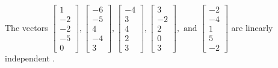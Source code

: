 \begin{exercise}
\begin{exerciseStatement}
  \end{exerciseStatement}
  \begin{exerciseAnswer}
   The vectors \(\left[\begin{array}{r}
1 \\
-2 \\
-2 \\
-5 \\
0
\end{array}\right] , \left[\begin{array}{r}
-6 \\
-5 \\
4 \\
-4 \\
3
\end{array}\right] , \left[\begin{array}{r}
-4 \\
3 \\
4 \\
2 \\
3
\end{array}\right] , \left[\begin{array}{r}
3 \\
-2 \\
2 \\
0 \\
3
\end{array}\right] , \text{ and } \left[\begin{array}{r}
-2 \\
-4 \\
1 \\
5 \\
-2
\end{array}\right]\) are 
  	 linearly independent  .
  


  \end{exerciseAnswer}
\end{exercise}